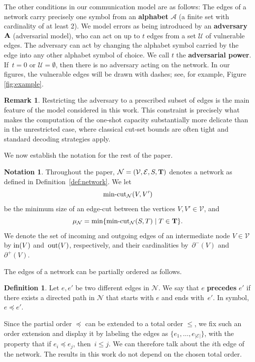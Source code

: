 \documentclass[11pt,a4paper]{article}
\theoremstyle{definition}
\newtheorem{definition}[theorem]{Definition}
\newtheorem{notation}[theorem]{Notation}
\newtheorem{remark}[theorem]{Remark}
\newcommand{\mA}{\mathcal{A}}
\newcommand{\mN}{\mathcal{N}}
\newcommand{\mU}{\mathcal{U}}
\newcommand{\mE}{\mathcal{E}}
\newcommand{\mV}{\mathcal{V}}
\newcommand{\inn}{\textnormal{in}}
\newcommand{\out}{\textnormal{out}}
\newcommand{\adv}{\textnormal{\textbf{A}}}
\newcommand{\mincut}{\textnormal{min-cut}}
\newcommand{\degin}{\partial^-}
\newcommand{\degout}{\partial^+}
\begin{document}
The other conditions in our communication model are as follows: The edges of a network carry precisely one symbol from an \textbf{alphabet} $\mA$
(a finite set with cardinality of at least 2). 
We model errors as being introduced by an \textbf{adversary} $\adv$ (adversarial model), who can act
on up to $t$ edges from a set $\mU$ of 
vulnerable edges. 
The adversary can act by changing the alphabet symbol carried by the edge into any other alphabet symbol of choice. We call $t$ the \textbf{adversarial power}. If~$t=0$ or $\mU=\emptyset$, then there is no adversary acting on the network. 
In our figures, the 
vulnerable edges will be drawn with dashes; see, for example, Figure \ref{fig:example}.

\begin{remark}
Restricting the adversary to a prescribed subset of edges is the main feature of the model considered in this work. This constraint is precisely what makes the computation of the one‑shot capacity substantially more delicate than in the unrestricted case, where classical cut‑set bounds are often tight and standard decoding strategies apply.
\end{remark}

We now establish the notation for the rest of the paper.

\begin{notation} 
\label{not:fixN}
Throughout the paper, $\mN=(\mV,\mE,S,{\bf T})$ denotes a network as defined in Definition~\ref{def:network}. We let $$\mincut_\mN(V,V')$$
be the minimum size of an edge-cut between the vertices $V,V' \in \mV$, and 
$$\mu_{\mN}= \min\{\mincut_\mN(S,T) \mid T \in \bf T\}.$$ We denote the
set of incoming and outgoing edges of an intermediate node $V \in \mV$ by $\inn(V)$ and~$\out(V)$, respectively, and their cardinalities by~$\degin(V)$ and~$\degout(V)$. 
\end{notation}

The edges of a network
can be partially ordered as follows.


\begin{definition}
\label{def:order}
Let $e,e'$ be two different edges in $\mN$. We say that $e$ \textbf{precedes} $e'$ if
there exists a directed path in $\mN$ that starts with $e$ and ends with~$e'$. In symbol, $e \preceq e'$.
\end{definition}


Since the partial order $\preceq$ can be extended to a total order $\le$, we fix such an order extension and display it by labeling the edges as $\{e_1, \ldots, e_{|\mE|}\}$, with the property that if $e_i \preceq e_j$, then~$i \le j$. We can therefore talk about the $i$th edge of the network.
The results in this work do not depend on the chosen total order. 
\end{document}
